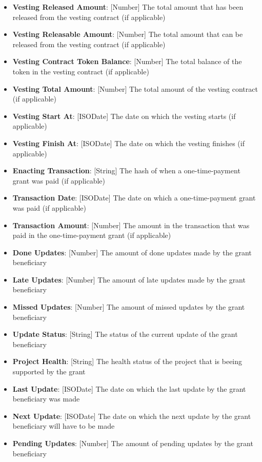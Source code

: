 \documentclass[MSE,Master,english]{twbook}%
\begin{document}
\begin{itemize}
  \item \textbf{Vesting Released Amount}: [Number] The total amount that has been released from the vesting contract (if applicable)
  \item \textbf{Vesting Releasable Amount}: [Number] The total amount that can be released from the vesting contract (if applicable)
  \item \textbf{Vesting Contract Token Balance}: [Number] The total balance of the token in the vesting contract (if applicable)
  \item \textbf{Vesting Total Amount}: [Number] The total amount of the vesting contract (if applicable)
  \item \textbf{Vesting Start At}: [ISODate] The date on which the vesting starts (if applicable)
  \item \textbf{Vesting Finish At}: [ISODate] The date on which the vesting finishes (if applicable)
  \item \textbf{Enacting Transaction}: [String] The hash of when a one-time-payment grant was paid (if applicable)
  \item \textbf{Transaction Date}: [ISODate] The date on which a one-time-payment grant was paid (if applicable)
  \item \textbf{Transaction Amount}: [Number] The amount in the transaction that was paid in the one-time-payment grant (if applicable)
  \item \textbf{Done Updates}: [Number] The amount of done updates made by the grant beneficiary
  \item \textbf{Late Updates}: [Number] The amount of late updates made by the grant beneficiary
  \item \textbf{Missed Updates}: [Number] The amount of missed updates by the grant beneficiary
  \item \textbf{Update Status}: [String] The status of the current update of the grant beneficiary
  \item \textbf{Project Health}: [String] The health status of the project that is beeing supported by the grant
  \item \textbf{Last Update}: [ISODate] The date on which the last update by the grant beneficiary was made
  \item \textbf{Next Update}: [ISODate] The date on which the next update by the grant beneficiary will have to be made
  \item \textbf{Pending Updates}: [Number] The amount of pending updates by the grant beneficiary
\end{itemize}
\end{document}
